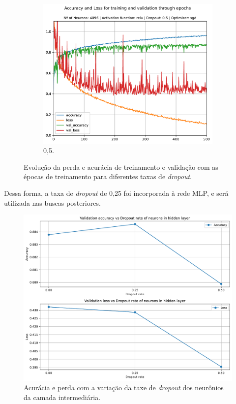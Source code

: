 \begin{figure}[H]
	\begin{subfigure}[H]{0.49\textwidth}
		\centering
		\includegraphics[width = \textwidth]{../../plot/mlp/mlp_4096_relu_0.5_sgd}
		\caption{0,5.}
		\label{fig:mlp_4096_relu_0.5_sgd}
	\end{subfigure}
	\caption{Evolução da perda e acurácia de treinamento e validação com as épocas de treinamento para diferentes taxas de \textit{dropout}.}
	\label{fig:training_search_dropout}
\end{figure}

Dessa forma, a taxa de \textit{dropout} de 0,25 foi incorporada à rede MLP, e será utilizada nas buscas posteriores.

\begin{figure}[H]
\centering
\includegraphics[width=0.75\linewidth]{../../plot/mlp/search_dropout}
\caption{Acurácia e perda com a variação da taxe de \textit{dropout} dos neurônios da camada intermediária.}
\label{fig:search_dropout}
\end{figure}

